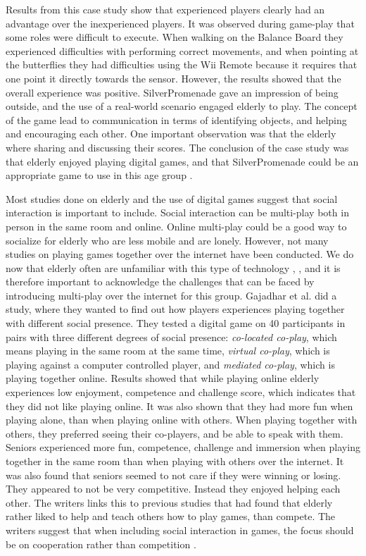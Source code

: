 Results from this case study show that experienced players clearly had an advantage over the inexperienced players. It was observed during game-play that some roles were difficult to execute. When walking on the Balance Board they experienced difficulties with performing correct movements, and when pointing at the butterflies they had difficulties using the Wii Remote because it requires that one point it directly towards the sensor. However, the results showed that the overall experience was positive. SilverPromenade gave an impression of being outside, and the use of a real-world scenario engaged elderly to play. The concept of the game lead to communication in terms of identifying objects, and helping and encouraging each other. One important observation was that the elderly where sharing and discussing their scores. The conclusion of the case study was that elderly enjoyed playing digital games, and that SilverPromenade could be an appropriate game to use in this age group \cite{gerling2}.

Most studies done on elderly and the use of digital games suggest that social interaction is important to include. Social interaction can be multi-play both in person in the same room and online. Online multi-play could be a good way to socialize for elderly who are less mobile and are lonely. However, not many studies on playing games together over the internet have been conducted. We do now that elderly often are unfamiliar with this type of technology \cite{Billis}, \cite{gregor}, and it is therefore important to acknowledge the challenges that can be faced by introducing multi-play over the internet for this group. Gajadhar et al. \cite{Gajadhar} did a study, where they wanted to find out how players experiences playing together with different social presence. They tested a digital game on 40 participants in pairs with three different degrees of social presence: \emph{co-located co-play}, which means playing in the same room at the same time, \emph{virtual co-play}, which is playing against a computer controlled player, and \emph{mediated co-play}, which is playing together online. Results showed that while playing online elderly experiences low enjoyment, competence and challenge score, which indicates that they did not like playing online. It was also shown that they had more fun when playing alone, than when playing online with others. When playing together with others, they preferred seeing their co-players, and be able to speak with them. Seniors experienced more fun, competence, challenge and immersion when playing together in the same room than when playing with others over the internet. It was also found that seniors seemed to not care if they were winning or losing. They appeared to not be very competitive.  Instead they enjoyed helping each other. The writers links this to previous studies that had found that elderly rather liked to help and teach others how to play games, than compete. The writers suggest that when including social interaction in games, the focus should be on cooperation rather than competition \cite{Gajadhar}. 


